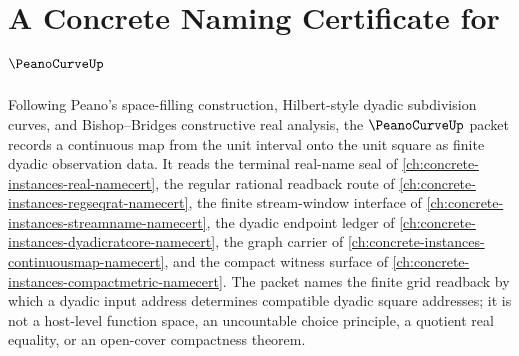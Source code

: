 \chapter{A Concrete Naming Certificate for $\PeanoCurveUp$}
\label{ch:concrete-instances-peano-curve-namecert}

Following Peano's space-filling construction, Hilbert-style dyadic subdivision curves, and Bishop--Bridges constructive real analysis, the $\PeanoCurveUp$ packet records a continuous map from the unit interval onto the unit square as finite dyadic observation data. It reads the terminal real-name seal of \autoref{ch:concrete-instances-real-namecert}, the regular rational readback route of \autoref{ch:concrete-instances-regseqrat-namecert}, the finite stream-window interface of \autoref{ch:concrete-instances-streamname-namecert}, the dyadic endpoint ledger of \autoref{ch:concrete-instances-dyadicratcore-namecert}, the graph carrier of \autoref{ch:concrete-instances-continuousmap-namecert}, and the compact witness surface of \autoref{ch:concrete-instances-compactmetric-namecert}. The packet names the finite grid readback by which a dyadic input address determines compatible dyadic square addresses; it is not a host-level function space, an uncountable choice principle, a quotient real equality, or an open-cover compactness theorem.

